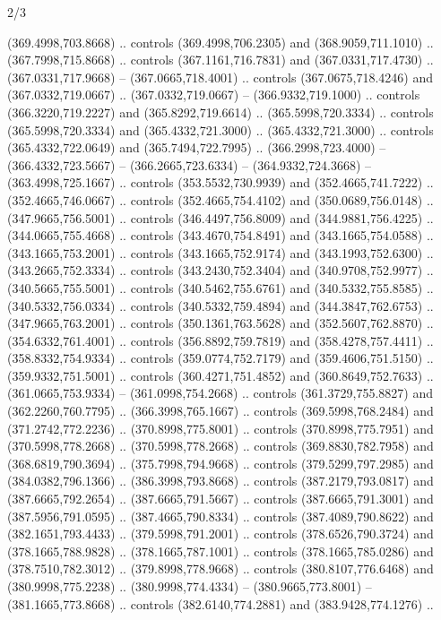 \begin{flagdescription}{2/3}
\begin{scope}[xshift=0.5\flaglength,yshift=0.5\flagwidth,scale=\flagwidth/525.28]
\begin{scope}[y=0.1mm, x=0.1mm, yscale=-1,shift={(-381.5,-404)}]
\begin{scope}[shift={(5.25001,4.53053)},miter limit=4.00,line width=0.800\lw]
  (369.4998,703.8668) .. controls (369.4998,706.2305) and (368.9059,711.1010) ..
  (367.7998,715.8668) .. controls (367.1161,716.7831) and (367.0331,717.4730) ..
  (367.0331,717.9668) -- (367.0665,718.4001) .. controls (367.0675,718.4246) and
  (367.0332,719.0667) .. (367.0332,719.0667) -- (366.9332,719.1000) .. controls
  (366.3220,719.2227) and (365.8292,719.6614) .. (365.5998,720.3334) .. controls
  (365.5998,720.3334) and (365.4332,721.3000) .. (365.4332,721.3000) .. controls
  (365.4332,722.0649) and (365.7494,722.7995) .. (366.2998,723.4000) --
  (366.4332,723.5667) -- (366.2665,723.6334) -- (364.9332,724.3668) --
  (363.4998,725.1667) .. controls (353.5532,730.9939) and (352.4665,741.7222) ..
  (352.4665,746.0667) .. controls (352.4665,754.4102) and (350.0689,756.0148) ..
  (347.9665,756.5001) .. controls (346.4497,756.8009) and (344.9881,756.4225) ..
  (344.0665,755.4668) .. controls (343.4670,754.8491) and (343.1665,754.0588) ..
  (343.1665,753.2001) .. controls (343.1665,752.9174) and (343.1993,752.6300) ..
  (343.2665,752.3334) .. controls (343.2430,752.3404) and (340.9708,752.9977) ..
  (340.5665,755.5001) .. controls (340.5462,755.6761) and (340.5332,755.8585) ..
  (340.5332,756.0334) .. controls (340.5332,759.4894) and (344.3847,762.6753) ..
  (347.9665,763.2001) .. controls (350.1361,763.5628) and (352.5607,762.8870) ..
  (354.6332,761.4001) .. controls (356.8892,759.7819) and (358.4278,757.4411) ..
  (358.8332,754.9334) .. controls (359.0774,752.7179) and (359.4606,751.5150) ..
  (359.9332,751.5001) .. controls (360.4271,751.4852) and (360.8649,752.7633) ..
  (361.0665,753.9334) -- (361.0998,754.2668) .. controls (361.3729,755.8827) and
  (362.2260,760.7795) .. (366.3998,765.1667) .. controls (369.5998,768.2484) and
  (371.2742,772.2236) .. (370.8998,775.8001) .. controls (370.8998,775.7951) and
  (370.5998,778.2668) .. (370.5998,778.2668) .. controls (369.8830,782.7958) and
  (368.6819,790.3694) .. (375.7998,794.9668) .. controls (379.5299,797.2985) and
  (384.0382,796.1366) .. (386.3998,793.8668) .. controls (387.2179,793.0817) and
  (387.6665,792.2654) .. (387.6665,791.5667) .. controls (387.6665,791.3001) and
  (387.5956,791.0595) .. (387.4665,790.8334) .. controls (387.4089,790.8622) and
  (382.1651,793.4433) .. (379.5998,791.2001) .. controls (378.6526,790.3724) and
  (378.1665,788.9828) .. (378.1665,787.1001) .. controls (378.1665,785.0286) and
  (378.7510,782.3012) .. (379.8998,778.9668) .. controls (380.8107,776.6468) and
  (380.9998,775.2238) .. (380.9998,774.4334) -- (380.9665,773.8001) --
  (381.1665,773.8668) .. controls (382.6140,774.2881) and (383.9428,774.1276) ..

\end{scope}
\end{scope}
\end{scope}
\end{flagdescription}
